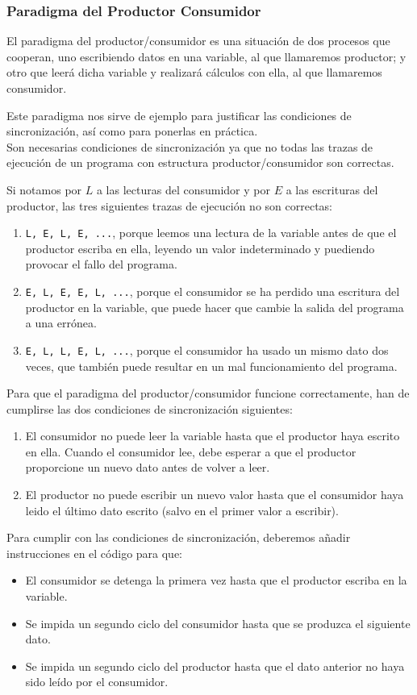 \subsubsection{Paradigma del Productor Consumidor}
El paradigma del productor/consumidor es una situación de dos procesos que cooperan, uno escribiendo datos en una variable, al que llamaremos productor; y otro que leerá dicha variable y realizará cálculos con ella, al que llamaremos consumidor.

Este paradigma nos sirve de ejemplo para justificar las condiciones de sincronización, así como para ponerlas en práctica.\\

Son necesarias condiciones de sincronización ya que no todas las trazas de ejecución de un programa con estructura productor/consumidor son correctas.

\begin{ejemplo}
    Si notamos por $L$ a las lecturas del consumidor y por $E$ a las escrituras del productor, las tres siguientes trazas de ejecución no son correctas:
    \begin{enumerate}
        \item \verb|L, E, L, E, ...|, porque leemos una lectura de la variable antes de que el productor escriba en ella, leyendo un valor indeterminado y puediendo provocar el fallo del programa.
        \item \verb|E, L, E, E, L, ...|, porque el consumidor se ha perdido una escritura del productor en la variable, que puede hacer que cambie la salida del programa a una errónea.
        \item \verb|E, L, L, E, L, ...|, porque el consumidor ha usado un mismo dato dos veces, que también puede resultar en un mal funcionamiento del programa.
    \end{enumerate}
\end{ejemplo}

Para que el paradigma del productor/consumidor funcione correctamente, han de cumplirse las dos condiciones de sincronización siguientes:
\begin{enumerate}
    \item El consumidor no puede leer la variable hasta que el productor haya escrito en ella. Cuando el consumidor lee, debe esperar a que el productor proporcione un nuevo dato antes de volver a leer.
    \item El productor no puede escribir un nuevo valor hasta que el consumidor haya leido el último dato escrito (salvo en el primer valor a escribir).
\end{enumerate}
Para cumplir con las condiciones de sincronización, deberemos añadir instrucciones en el código para que:
\begin{itemize}
    \item El consumidor se detenga la primera vez hasta que el productor escriba en la variable.
    \item Se impida un segundo ciclo del consumidor hasta que se produzca el siguiente dato.
    \item Se impida un segundo ciclo del productor hasta que el dato anterior no haya sido leído por el consumidor.
\end{itemize}

